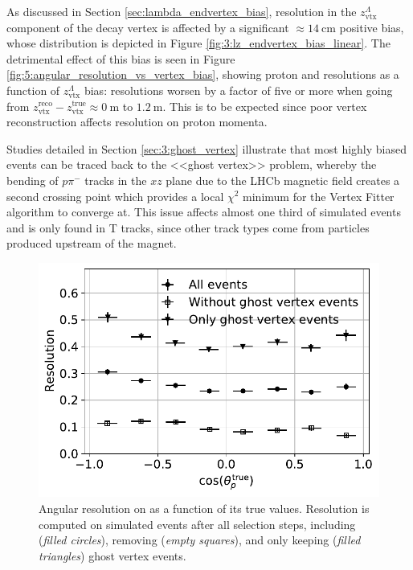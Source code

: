 As discussed in Section \ref{sec:lambda_endvertex_bias}, resolution in the $z_\text{vtx}^\Lambda$ component of the \lambdadecay decay vertex is affected by a significant $\approx \SI{14}{\centi\meter}$ positive bias, whose distribution is depicted in Figure \ref{fig:3:lz_endvertex_bias_linear}.
The detrimental effect of this bias is seen in Figure \ref{fig:5:angular_resolution_vs_vertex_bias}, showing proton \cthetap and \phip resolutions as a function of $z_\text{vtx}^\Lambda$ bias:
resolutions worsen by a factor of five or more when going from $z_\text{vtx}^\text{reco} - z_\text{vtx}^\text{true} \approx \SI{0}{\meter}$ to $\SI{1.2}{\meter}$.
This is to be expected since poor \lz vertex reconstruction affects resolution on proton momenta.


Studies detailed in Section \ref{sec:3:ghost_vertex} illustrate that most highly biased events can be traced back to the <<ghost vertex>> problem, whereby the bending of $p\pi^-$ tracks in the $xz$ plane due to the LHCb magnetic field creates a second crossing point which provides a local $\chi^2$ minimum for the Vertex Fitter algorithm to converge at.
This issue affects almost one third of \demonstratorshort simulated events and is only found in T tracks, since other track types come from particles produced upstream of the magnet.

\begin{figure}[t]
	\centering
	\includegraphics[width=.7\textwidth]{graphics/05-angular_distributions/MCRECO_p_theta_resolution_nocross.pdf}
	\caption{Angular resolution on \cthetap as a function of its true values. Resolution is computed on simulated \demonstratorshort events after all selection steps, including (\textit{filled circles}), removing (\textit{empty squares}), and only keeping (\textit{filled triangles}) \lambdadecay ghost vertex events.}
	\label{fig:5:theta_resolution_nocross}
\end{figure}

